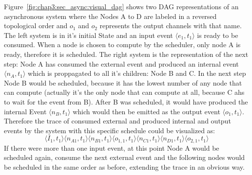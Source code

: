 Figure~\ref{fig:chap3:sec_async:visual_dag} shows two DAG representations of an asynchronous system where the Nodes A to D are labeled
in a reversed topological order and \(o_1\) and \(o_2\) represents the output channels with that name.
The left system is in it's initial State and an input event \(\langle e_1,t_1\rangle\) is ready to be consumed.
When a node is chosen to compute by the scheduler, only node A is ready, therefore it is scheduled.
The right system is the representation of the next step: Node A has consumed the external event and produced an internal event
\(\langle n_A,t_1\rangle\) which is proppagated to all it's children: Node B and C.
In the next step Node B would be scheduled, because it has the lowest number of any node that can compute (actually it's the only node that can compute at all, because C ahs to wait for the event from B).
After B was scheduled, it would have produced the internal Event \(\langle n_B,t_1\rangle\) which would then be emitted as the output event
\(\langle o_1,t_1 \rangle\).
Therefore the trace of consumed external and produced internal and output events by the system with this specific schedule could be visualized as:
\[
  \langle I_1,t_1 \rangle \langle n_{A1},t_1 \rangle \langle n_{B1},t_1 \rangle \langle o_{1,1},t_1 \rangle \langle n_{C1},t_1 \rangle \langle n_{D1},t_1 \rangle \langle o_{2,1},t_1 \rangle
\]
If there were more than one input event, at this point Node A would be scheduled again, consume the next external event and the following nodes would be scheduled in the same order as before,
extending the trace in an obvious way.

